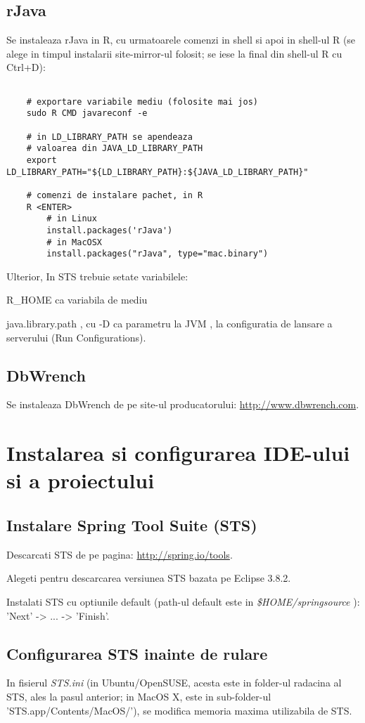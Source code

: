 \subsection{rJava}
Se instaleaza rJava in R, cu urmatoarele comenzi in shell si apoi in shell-ul R
(se alege in timpul instalarii site-mirror-ul folosit;
se iese la final din shell-ul R cu Ctrl+D):
\begin{lstlisting}

	# exportare variabile mediu (folosite mai jos)
	sudo R CMD javareconf -e
	
	# in LD_LIBRARY_PATH se apendeaza 
	# valoarea din JAVA_LD_LIBRARY_PATH 
	export LD_LIBRARY_PATH="${LD_LIBRARY_PATH}:${JAVA_LD_LIBRARY_PATH}"

	# comenzi de instalare pachet, in R
	R <ENTER>
		# in Linux
		install.packages('rJava')
		# in MacOSX	
		install.packages("rJava", type="mac.binary")
\end{lstlisting}

Ulterior, In STS trebuie setate variabilele:

R\_HOME ca variabila de mediu

java.library.path , cu -D ca parametru la JVM , la configuratia de lansare a serverului (Run Configurations).


\subsection{DbWrench}
Se instaleaza DbWrench de pe site-ul producatorului:
\url{http://www.dbwrench.com}.

\section{Instalarea si configurarea IDE-ului si a proiectului}

\subsection{Instalare Spring Tool Suite (STS)}
Descarcati STS de pe pagina:
\url{http://spring.io/tools}.

Alegeti pentru descarcarea versiunea STS bazata pe Eclipse 3.8.2.

Instalati STS cu optiunile default (path-ul default este in \emph{\$HOME/springsource} ):
'Next' -> ... -> 'Finish'.

\subsection{Configurarea STS inainte de rulare}
In fisierul \emph{STS.ini} (in Ubuntu/OpenSUSE, acesta este in folder-ul
radacina al STS, ales la pasul anterior; in MacOS X, este in sub-folder-ul
'STS.app/Contents/MacOS/'), se modifica memoria maxima utilizabila de STS.

